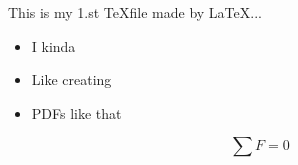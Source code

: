 \documentclass{article}
\begin{document}
    This is my 1.st \TeX file made by \LaTeX ...
    \begin{itemize}
        \item I kinda 
        \item Like creating
        \item PDFs like that
    \end{itemize}

    \begin{equation}
        \sum F = 0
    \end{equation}

\end{document}
